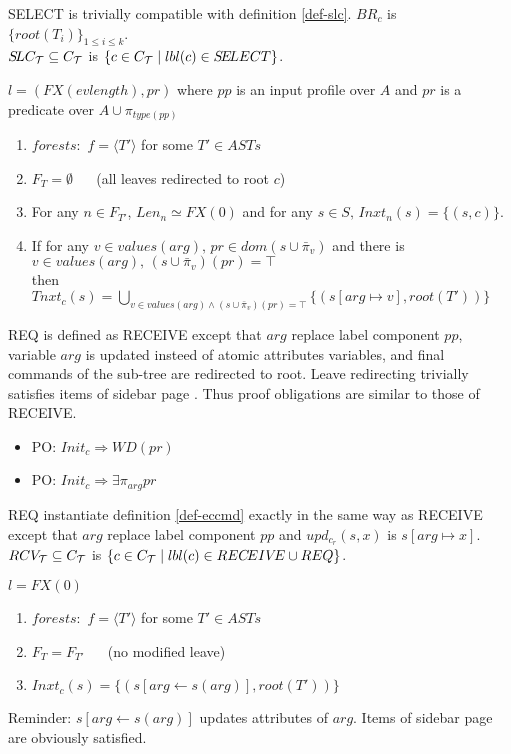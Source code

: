 \documentclass{article}
\begin{document}
SELECT is trivially compatible with definition \ref{def-slc}. $BR_c$ is $\{root(T_i)\}_{1\leq i\leq k}$.\\
 $S\!LC_{\cal T}\subseteq C_{\cal T}$ is $\{c\in C_{\cal T}\mid lbl(c)\in S\!E\!LECT\}$.
\begin{definition}[REQ]$l=(FX(evlength),pr)$ where $pp$ is an input profile over $A$ and $pr$ is a predicate over $A\cup\pi_{type(pp)}$
\begin{enumerate} 
\item $forests:$  $f=\langle T'\rangle$ for some $T'\in ASTs$
\item $F_T=\emptyset~~~~~~$ {\small (all leaves redirected to root $c$)}
\item For any $n\in F_{T'}$, $Len_n\simeq FX(0)$ and for any $s\in S,\,Inxt_n(s)=\{(s,c)\}$.
\item If for any $v\in values(arg),\,pr\in dom(s\cup \bar\pi_v)$ and there is $v\in values(arg),\,(s\cup \bar\pi_v)(pr)=\top$\\
      then $T\!nxt_c(s)=\bigcup_{v\in values(arg) \wedge (s\cup \bar\pi_v)(pr)=\top}\{(s[arg\mapsto v],root(T'))\}$
\end{enumerate}
\end{definition}
REQ is defined as RECEIVE except that $arg$ replace label component $pp$, variable $arg$ is updated insteed of atomic attributes variables, and final commands of the sub-tree are redirected to root. Leave redirecting trivially satisfies items of sidebar page \pageref{safestates}. Thus proof obligations are similar to those of RECEIVE.
\begin{itemize}
\item PO: $Init_c\Rightarrow W\!D(pr)$
\item PO: $Init_c\Rightarrow \exists \pi_{arg} pr$
\end{itemize}
REQ instantiate definition \ref{def-eccmd} exactly in the same way as RECEIVE except that $arg$ replace label component $pp$ and $upd_{c_r}(s,x)$ is $s[arg\mapsto x]$.
 $RCV_{\cal T}\subseteq C_{\cal T}$ is $\{c\in C_{\cal T}\mid lbl(c)\in REC\!EIV\!E\cup REQ\}$.
\begin{definition}[ARG]$l=FX(0)$
\begin{enumerate} 
\item $forests:$  $f=\langle T'\rangle$ for some $T'\in ASTs$
\item $F_T=F_{T'}~~~~~~$ {\small (no modified leave)}\setcounter{enumi}{3} 
\item $Inxt_c(s)=\{(s[arg\leftarrow s(arg)],root(T'))\}$
\end{enumerate}
\end{definition}
Reminder: $s[arg\leftarrow s(arg)]$ updates attributes of $arg$. Items of sidebar page \pageref{safestates} are obviously satisfied.
\end{document}
